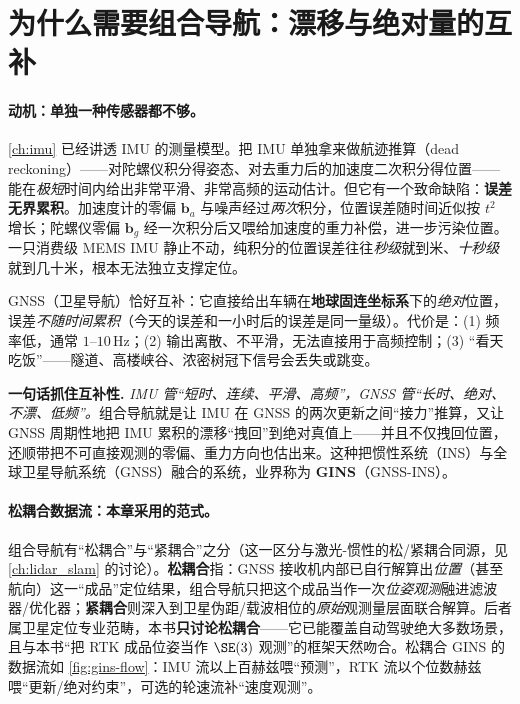 \section{为什么需要组合导航：漂移与绝对量的互补}
\label{sec:gins-why}

\paragraph{动机：单独一种传感器都不够。}
\cref{ch:imu} 已经讲透 IMU 的测量模型。把 IMU 单独拿来做航迹推算（dead reckoning）——对陀螺仪积分得姿态、对去重力后的加速度二次积分得位置——能在\emph{极短}时间内给出非常平滑、非常高频的运动估计。但它有一个致命缺陷：\textbf{误差无界累积}。加速度计的零偏 $\mathbf{b}_a$ 与噪声经过\emph{两次}积分，位置误差随时间近似按 $t^2$ 增长；陀螺仪零偏 $\mathbf{b}_g$ 经一次积分后又喂给加速度的重力补偿，进一步污染位置。一只消费级 MEMS IMU 静止不动，纯积分的位置误差往往\emph{秒级}就到米、\emph{十秒级}就到几十米，根本无法独立支撑定位。

GNSS（卫星导航）恰好互补：它直接给出车辆在\textbf{地球固连坐标系}下的\emph{绝对}位置，误差\emph{不随时间累积}（今天的误差和一小时后的误差是同一量级）。代价是：(1) 频率低，通常 $1$–$10$\,Hz；(2) 输出离散、不平滑，无法直接用于高频控制；(3) “看天吃饭”——隧道、高楼峡谷、浓密树冠下信号会丢失或跳变\cite{gao2023slamad}。

\begin{note}
\textbf{一句话抓住互补性.}\;
\emph{IMU 管“短时、连续、平滑、高频”，GNSS 管“长时、绝对、不漂、低频”。}组合导航就是让 IMU 在 GNSS 的两次更新之间“接力”推算，又让 GNSS 周期性地把 IMU 累积的漂移“拽回”到绝对真值上——并且不仅拽回位置，还顺带把不可直接观测的零偏、重力方向也估出来。这种把惯性系统（INS）与全球卫星导航系统（GNSS）融合的系统，业界称为 \textbf{GINS}（GNSS-INS）\cite{gao2023slamad}。
\end{note}

\paragraph{松耦合数据流：本章采用的范式。}
组合导航有“松耦合”与“紧耦合”之分（这一区分与激光-惯性的松/紧耦合同源，见 \cref{ch:lidar_slam} 的讨论）。\textbf{松耦合}指：GNSS 接收机内部已自行解算出\emph{位置}（甚至航向）这一“成品”定位结果，组合导航只把这个成品当作一次\emph{位姿观测}融进滤波器/优化器；\textbf{紧耦合}则深入到卫星伪距/载波相位的\emph{原始}观测量层面联合解算。后者属卫星定位专业范畴，本书\textbf{只讨论松耦合}——它已能覆盖自动驾驶绝大多数场景，且与本书“把 RTK 成品位姿当作 $\SE(3)$ 观测”的框架天然吻合\cite{gao2023slamad}。松耦合 GINS 的数据流如 \cref{fig:gins-flow}：IMU 流以上百赫兹喂“预测”，RTK 流以个位数赫兹喂“更新/绝对约束”，可选的轮速流补“速度观测”。

